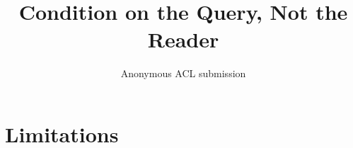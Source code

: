 \documentclass[11pt]{article}
\title{Condition on the Query, Not the Reader}
\author{Anonymous ACL submission}
\begin{document}
\maketitle










\section*{Limitations}



\end{document}
